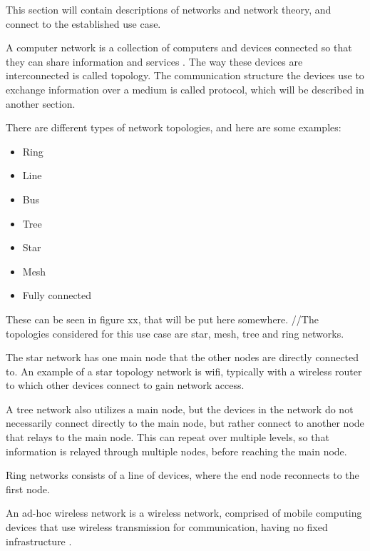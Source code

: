 This section will contain descriptions of networks and network theory, and connect to the established use case.

A computer network is a collection of computers and devices connected so that they can share information and services \cite{mansfield2009computer}. The way these devices are interconnected is called topology. The communication structure the devices use to exchange information over a medium is called protocol, which will be described in another section.

There are different types of network topologies, and here are some examples:
\begin{itemize}
	\item Ring
	\item Line
	\item Bus
	\item Tree
	\item Star
	\item Mesh
	\item Fully connected
\end{itemize}

These can be seen in figure xx, that will be put here somewhere. //The topologies considered for this use case are star, mesh, tree and ring networks. 

The star network has one main node that the other nodes are directly connected to. An example of a star topology network is wifi, typically with a wireless router to which other devices connect to gain network access. 

A tree network also utilizes a main node, but the devices in the network do not necessarily connect directly to the main node, but rather connect to another node that relays to the main node. This can repeat over multiple levels, so that information is relayed through multiple nodes, before reaching the main node. 

Ring networks consists of a line of devices, where the end node reconnects to the first node. 



An ad-hoc wireless network is a wireless network, comprised of mobile computing devices that use wireless transmission for communication, having no fixed infrastructure \cite{murthy2004ad}. 